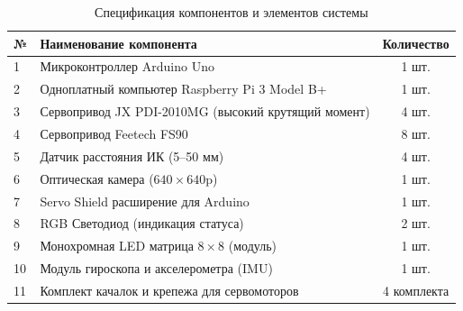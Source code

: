 \documentclass[11pt, a4paper]{article}
\begin{document}
\begin{table}[h!]
    \centering
    \caption{Спецификация компонентов и элементов системы}
    \label{tab:components}
    \vspace{0.5em}
    \begin{tabular}{llc}
        \toprule
        \textbf{№} & \textbf{Наименование компонента} & \textbf{Количество} \\
        \midrule
        1 & Микроконтроллер Arduino Uno & 1 шт. \\
        2 & Одноплатный компьютер Raspberry Pi 3 Model B+ & 1 шт. \\
        3 & Сервопривод JX PDI-2010MG (высокий крутящий момент) & 4 шт. \\
        4 & Сервопривод Feetech FS90 & 8 шт. \\
        5 & Датчик расстояния ИК (5–50 мм) & 4 шт. \\
        6 & Оптическая камера ($640\times640\text{p}$) & 1 шт. \\
        7 & Servo Shield расширение для Arduino & 1 шт. \\
        8 & RGB Светодиод (индикация статуса) & 2 шт. \\
        9 & Монохромная LED матрица $8\times8$ (модуль) & 1 шт. \\
        10 & Модуль гироскопа и акселерометра (IMU) & 1 шт. \\
        11 & Комплект качалок и крепежа для сервомоторов & 4 комплекта \\
        \bottomrule
    \end{tabular}
\end{table}
	
\end{document}
